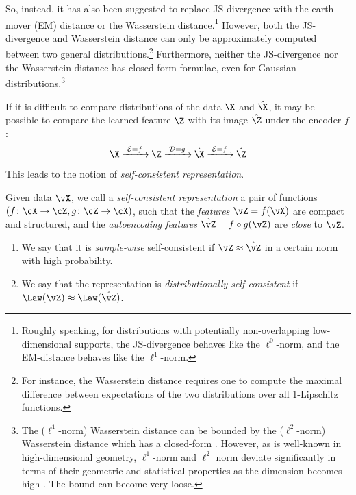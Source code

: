 \documentclass[../../book-main.tex]{subfiles}
\begin{document}
So, instead, it has also been suggested to replace JS-divergence with
the earth mover (EM) distance or the Wasserstein
distance.\footnote{Roughly speaking, for distributions with
    potentially non-overlapping low-dimensional supports, the
    JS-divergence behaves like the $\ell^0$-norm, and the EM-distance
behaves like the $\ell^1$-norm.} However, both the JS-divergence and
Wasserstein distance can only be approximately computed between two
general distributions.\footnote{For instance, the Wasserstein
    distance requires one to compute the maximal difference between
    expectations of the two distributions over all 1-Lipschitz
functions.} Furthermore, neither the JS-divergence nor the
Wasserstein distance has closed-form formulae, even for Gaussian
distributions.\footnote{The ($\ell^1$-norm) Wasserstein distance can
    be bounded by the ($\ell^2$-norm) Wasserstein distance which has a
    closed-form \cite{salmona2021gromovwasserstein}. However, as is
    well-known in high-dimensional geometry, $\ell^1$-norm and $\ell^2$
    norm deviate significantly in terms of their geometric and
    statistical properties as the dimension becomes high
\cite{Wright-Ma-2022}. The bound can become very loose.}

If it is difficult to compare distributions of the data $\X$ and
$\hat \X$, it may be possible to compare the learned feature $\Z$
with its image $\hat \Z$ under the encoder $f$:
\begin{equation}
    \X
    \xrightarrow{\hspace{1mm} \mathcal{E} = f \hspace{1mm}} \Z
    \xrightarrow{\hspace{1mm} \mathcal{D} = g \hspace{1mm}} \hat{\X}
    \xrightarrow{\hspace{1mm} \mathcal{E} = f \hspace{1mm}} \hat \Z
    \label{eqn:closed-autoencoding}
\end{equation}
This leads to the notion of {\em self-consistent representation}.
\begin{definition}\label{def:closed_loop}
    Given data \(\vX\), we call a \textit{self-consistent
    representation} a pair of functions \((f \colon \cX \to \cZ, g
    \colon \cZ \to \cX)\), such that the \textit{features} \(\vZ =
    f(\vX)\) are compact and structured, and the \textit{autoencoding
    features} \(\hat{\vZ} \doteq f \circ g(\vZ)\) are \textit{close} to \(\vZ\).
    \begin{enumerate}
        \item We say that it is \textit{sample-wise} self-consistent
            if \(\vZ \approx \hat{\vZ}\) in a certain norm with high
            probability.
        \item We say that the representation is
            \textit{distributionally self-consistent} if \(\Law(\vZ)
            \approx \Law(\hat{\vZ})\).
    \end{enumerate}
\end{definition}
\end{document}

